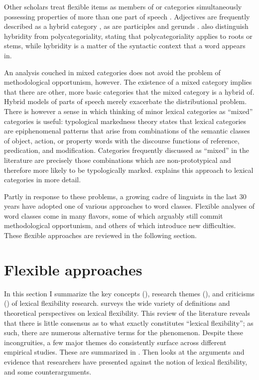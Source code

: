 Other scholars treat flexible items as members of  or  categories simultaneously possessing properties of more than one part of speech \parencites[149]{Loisetal2017}{Malouf1999}{NikolaevaSpencer2020}. Adjectives are frequently described as a hybrid category \parencites{Wetzer1996}[343]{Stassen1997}[13--16]{Pustet2003}[95]{GenettiHildebrandt2004}{Lier2017}, as are participles \parencite[704]{HopperThompson1984} and gerunds \parencite{Denison2001}. \textcite[149]{Loisetal2017} also distinguish hybridity from polycategoriality, stating that polycategoriality applies to roots or stems, while hybridity is a matter of the syntactic context that a word appears in.

An analysis couched in mixed categories does not avoid the problem of methodological opportunism, however. The existence of a mixed category implies that there are other, more basic categories that the mixed category is a hybrid of. Hybrid models of parts of speech merely exacerbate the distributional problem. There is however a sense in which thinking of minor lexical categories as \enquote{mixed} categories is useful: typological markedness theory states that lexical categories are epiphenomenal patterns that arise from combinations of the semantic classes of object, action, or property words with the discourse functions of reference, predication, and modification. Categories frequently discussed as \enquote{mixed} in the literature are precisely those combinations which are non-prototypical and therefore more likely to be typologically marked.  explains this approach to lexical categories in more detail.

Partly in response to these problems, a growing cadre of linguists in the last 30 years have adopted one of various  approaches to word classes. Flexible analyses of word classes come in many flavors, some of which arguably still commit methodological opportunism, and others of which introduce new difficulties. These flexible approaches are reviewed in the following section.

\section{Flexible approaches}
\label{sec:2.3}

In this section I summarize the key concepts (), research themes (), and criticisms () of lexical flexibility research.  surveys the wide variety of definitions and theoretical perspectives on lexical flexibility. This review of the literature reveals that there is little consensus as to what exactly constitutes \enquote{lexical flexibility}; as such, there are numerous alternative terms for the phenomenon. Despite these incongruities, a few major themes do consistently surface across different empirical studies. These are summarized in . Then  looks at the arguments and evidence that researchers have presented against the notion of lexical flexibility, and some counterarguments.

